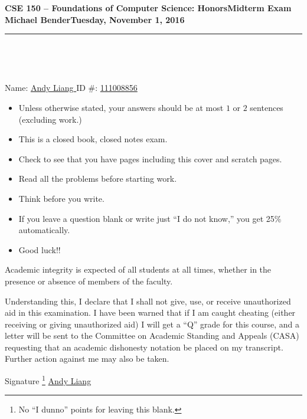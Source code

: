 \documentclass[12pt]{exam}
\begin{document}
{\bf
\noindent
CSE 150 --  Foundations of Computer Science: Honors\hfill             Midterm Exam\\
Michael Bender\hfill      Tuesday, November 1, 2016\\
}
\rule{\linewidth}{.01in}
\begin{center}
{\bf ~~~}
\end{center}
\\
\medskip
\bigskip

Name: \underline{\hspace{1in} Andy Liang \hspace{1in}} ID \#: \underline{\hspace{1in} 111008856 \hspace{1in}} \\[\bigskipamount]

\begin{itemize}
\item Unless otherwise stated, your answers should be at most $1$ or $2$ sentences (excluding work.)
\item This is a closed book, closed notes exam.
\item Check to see that you have \pageref{LastPage} pages including this cover and scratch pages. %
\item Read all the problems before starting work.
\item Think before you write.
\item If you leave a question blank or write just ``I do not know,'' you get 25\% automatically.
\item Good luck!!
\end{itemize}

Academic integrity is expected of all students at all times, whether
in the presence or absence of members of the faculty.

Understanding this, I declare that I shall not give, use, or receive
unauthorized aid in this examination.  I have been warned that if I
am caught cheating (either receiving or giving unauthorized aid) I
will get a ``Q'' grade for this course, and a letter will be sent to
the Committee on Academic Standing and Appeals (CASA) requesting
that an academic dishonesty notation be placed on my transcript.
Further action against me may also be taken.
\bigskip

\noindent
Signature \footnote{No ``I dunno'' points for leaving this blank. \smiley} \underline{\hspace{1in} Andy Liang \hspace{1in}}
\end{document}
